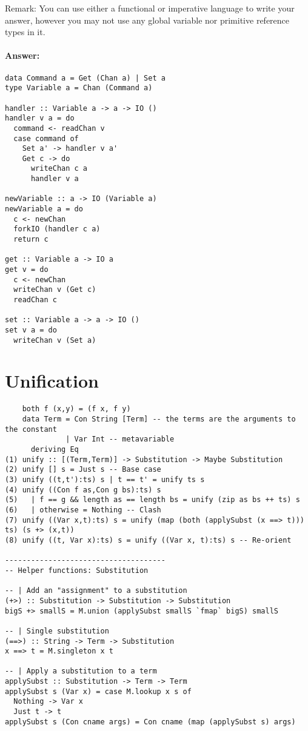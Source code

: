 \documentclass{article}
\newcommand{\answer}[0]{\paragraph{Answer:}}
\begin{document}
Remark: You can use either a functional or imperative language to
write your answer, however you may not use any global variable nor
primitive reference types in it.

\answer{
\begin{verbatim}    
data Command a = Get (Chan a) | Set a
type Variable a = Chan (Command a)

handler :: Variable a -> a -> IO ()
handler v a = do
  command <- readChan v
  case command of
    Set a' -> handler v a'
    Get c -> do 
      writeChan c a
      handler v a

newVariable :: a -> IO (Variable a)
newVariable a = do
  c <- newChan
  forkIO (handler c a)
  return c

get :: Variable a -> IO a
get v = do
  c <- newChan
  writeChan v (Get c)
  readChan c
  
set :: Variable a -> a -> IO ()
set v a = do
  writeChan v (Set a)
\end{verbatim}
}

\section{Unification}

\begin{verbatim}
    both f (x,y) = (f x, f y)
    data Term = Con String [Term] -- the terms are the arguments to the constant
              | Var Int -- metavariable
      deriving Eq
(1) unify :: [(Term,Term)] -> Substitution -> Maybe Substitution
(2) unify [] s = Just s -- Base case
(3) unify ((t,t'):ts) s | t == t' = unify ts s
(4) unify ((Con f as,Con g bs):ts) s
(5)   | f == g && length as == length bs = unify (zip as bs ++ ts) s
(6)   | otherwise = Nothing -- Clash
(7) unify ((Var x,t):ts) s = unify (map (both (applySubst (x ==> t))) ts) (s +> (x,t))
(8) unify ((t, Var x):ts) s = unify ((Var x, t):ts) s -- Re-orient

-------------------------------------
-- Helper functions: Substitution

-- | Add an "assignment" to a substitution
(+>) :: Substitution -> Substitution -> Substitution
bigS +> smallS = M.union (applySubst smallS `fmap` bigS) smallS

-- | Single substitution
(==>) :: String -> Term -> Substitution
x ==> t = M.singleton x t

-- | Apply a substitution to a term
applySubst :: Substitution -> Term -> Term
applySubst s (Var x) = case M.lookup x s of
  Nothing -> Var x
  Just t -> t
applySubst s (Con cname args) = Con cname (map (applySubst s) args)

\end{verbatim}
\end{document}
